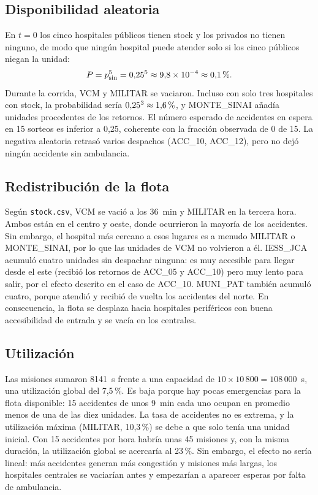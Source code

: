 \documentclass[conference,a4paper]{IEEEtran}
\begin{document}
\subsection{Disponibilidad aleatoria}
En $t=0$ los cinco hospitales públicos tienen stock y los privados no tienen ninguno, de
modo que ningún hospital puede atender solo si los cinco públicos niegan la unidad:
\begin{equation}
P = p_{\mathrm{sin}}^{5} = 0{,}25^{5} \approx 9{,}8\times10^{-4} \approx 0{,}1\text{\,\%}.
\end{equation}
Durante la corrida, VCM y MILITAR se vaciaron. Incluso con solo tres hospitales con stock,
la probabilidad sería $0{,}25^{3}\approx1{,}6\text{\,\%}$, y MONTE\_SINAI añadía unidades
procedentes de los retornos. El número esperado de accidentes en espera en 15 sorteos es
inferior a 0,25, coherente con la fracción observada de 0 de 15. La negativa aleatoria
retrasó varios despachos (ACC\_10, ACC\_12), pero no dejó ningún accidente sin
ambulancia.

\subsection{Redistribución de la flota}
Según \texttt{stock.csv}, VCM se vació a los 36~min y MILITAR en la tercera hora. Ambos
están en el centro y oeste, donde ocurrieron la mayoría de los accidentes. Sin embargo,
el hospital más cercano a esos lugares es a menudo MILITAR o MONTE\_SINAI, por lo que las
unidades de VCM no volvieron a él. IESS\_JCA acumuló cuatro unidades sin despachar
ninguna: es muy accesible para llegar desde el este (recibió los retornos de ACC\_05 y
ACC\_10) pero muy lento para salir, por el efecto descrito en el caso de ACC\_10.
MUNI\_PAT también acumuló cuatro, porque atendió y recibió de vuelta los accidentes del
norte. En consecuencia, la flota se desplaza hacia hospitales periféricos con buena
accesibilidad de entrada y se vacía en los centrales.

\subsection{Utilización}
Las misiones sumaron 8141~s frente a una capacidad de $10\times10\,800=108\,000$~s, una
utilización global del 7,5\,\%. Es baja porque hay pocas emergencias para la flota
disponible: 15 accidentes de unos 9~min cada uno ocupan en promedio menos de una de las
diez unidades. La tasa de accidentes no es extrema, y la utilización máxima (MILITAR,
10,3\,\%) se debe a que solo tenía una unidad inicial. Con 15 accidentes por hora habría
unas 45 misiones y, con la misma duración, la utilización global se acercaría al 23\,\%.
Sin embargo, el efecto no sería lineal: más accidentes generan más congestión y misiones
más largas, los hospitales centrales se vaciarían antes y empezarían a aparecer esperas
por falta de ambulancia.
\end{document}
